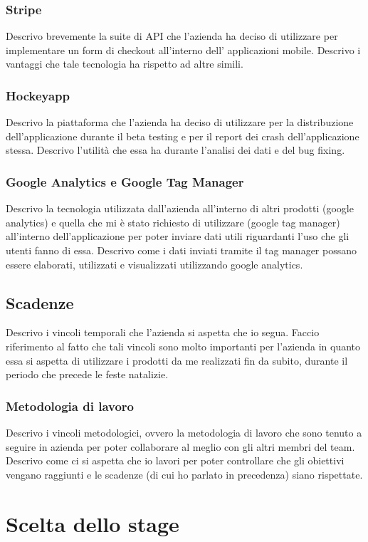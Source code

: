 			\subsubsection{Stripe}
				Descrivo brevemente la suite di API che l'azienda ha deciso di utilizzare per implementare un form di checkout
				all'interno dell' applicazioni mobile. Descrivo i vantaggi che tale tecnologia ha rispetto ad altre simili.
			\subsubsection{Hockeyapp}
				Descrivo la piattaforma che l'azienda ha deciso di utilizzare per la distribuzione dell'applicazione durante il
				beta testing e per il report dei crash dell'applicazione stessa. Descrivo l'utilità che essa ha durante l'analisi
				dei dati e del bug fixing.
			\subsubsection{Google Analytics e Google Tag Manager}
				Descrivo la tecnologia utilizzata dall'azienda all'interno di altri prodotti (google analytics) e quella che mi è
				stato richiesto di utilizzare (google tag manager) all'interno dell'applicazione per poter inviare dati utili
				riguardanti l'uso che gli utenti fanno di essa. Descrivo come i dati inviati tramite il tag manager possano essere
				elaborati, utilizzati e visualizzati utilizzando google analytics.
		\subsection{Scadenze}
			Descrivo i vincoli temporali che l'azienda si aspetta che io segua. Faccio riferimento al fatto che tali vincoli sono molto
			importanti per l'azienda in quanto essa si aspetta di utilizzare i prodotti da me realizzati fin da subito, durante il
			periodo che precede le feste natalizie.
		\subsubsection{Metodologia di lavoro}
			Descrivo i vincoli metodologici, ovvero la metodologia di lavoro che sono tenuto a seguire in azienda per poter collaborare
			al meglio con gli altri membri del team. Descrivo come ci si aspetta che io lavori per poter controllare che gli obiettivi
			vengano raggiunti e le scadenze (di cui ho parlato in precedenza) siano rispettate.
	\section{Scelta dello stage}
